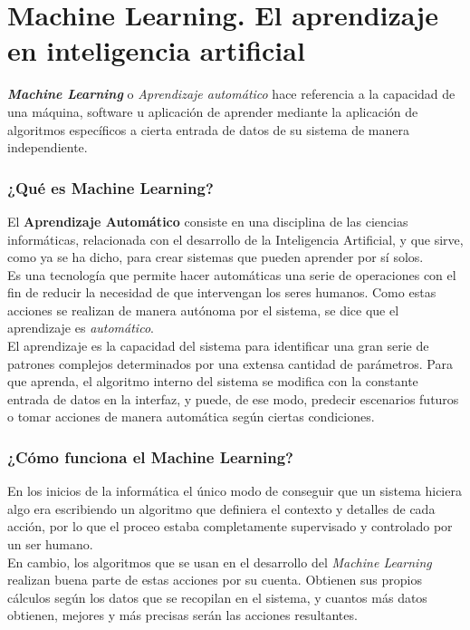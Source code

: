 \section{Machine Learning. El aprendizaje en inteligencia artificial}


\textbf{\textit{Machine Learning}} o \textit{Aprendizaje automático} hace referencia a la capacidad de una máquina, software u aplicación de aprender mediante la aplicación de algoritmos específicos a cierta entrada de datos de su sistema de manera independiente. \cite{apd2019ml}

\subsubsection{¿Qué es Machine Learning?}
El \textbf{Aprendizaje Automático} consiste en una disciplina de las ciencias informáticas, relacionada con el desarrollo de la Inteligencia Artificial, y que sirve, como ya se ha dicho, para crear sistemas que pueden aprender por sí solos. \\

Es una tecnología que permite hacer automáticas una serie de operaciones con el fin de reducir la necesidad de que intervengan los seres humanos. Como estas acciones se realizan de manera autónoma por el sistema, se dice que el aprendizaje es \textit{automático}.\\

El aprendizaje es la capacidad del sistema para identificar una gran serie de patrones complejos determinados por una extensa cantidad de parámetros. Para que aprenda, el algoritmo interno del sistema se modifica con la constante entrada de datos en la interfaz, y puede, de ese modo, predecir escenarios futuros o tomar acciones de manera automática según ciertas condiciones.

\subsubsection{¿Cómo funciona el Machine Learning?}
En los inicios de la informática el único modo de conseguir que un sistema hiciera algo era escribiendo un algoritmo que definiera el contexto y detalles de cada acción, por lo que el proceo estaba completamente supervisado y controlado por un ser humano. \\

En cambio, los algoritmos que se usan en el desarrollo del \textit{Machine Learning} realizan buena parte de estas acciones por su cuenta. Obtienen sus propios cálculos según los datos que se recopilan en el sistema, y cuantos más datos obtienen, mejores y más precisas serán las acciones resultantes. \\

